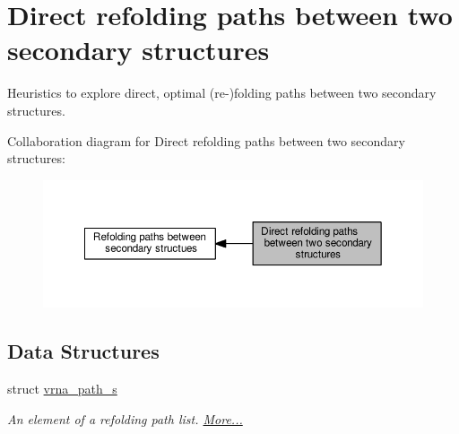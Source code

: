 \hypertarget{group__direct__paths}{}\section{Direct refolding paths between two secondary structures}
\label{group__direct__paths}


Heuristics to explore direct, optimal (re-\/)folding paths between two secondary structures.  


Collaboration diagram for Direct refolding paths between two secondary structures\+:
\nopagebreak
\begin{figure}[H]
\begin{center}
\leavevmode
\includegraphics[width=350pt]{group__direct__paths}
\end{center}
\end{figure}
\subsection*{Data Structures}
\begin{DoxyCompactItemize}
\item 
struct \hyperlink{group__direct__paths_structvrna__path__s}{vrna\+\_\+path\+\_\+s}
\begin{DoxyCompactList}\small\item\em An element of a refolding path list.  \hyperlink{group__direct__paths_structvrna__path__s}{More...}\end{DoxyCompactList}\end{DoxyCompactItemize}
